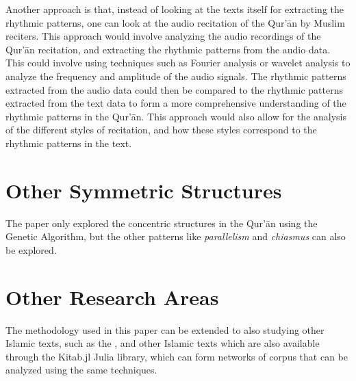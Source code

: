 Another approach is that, instead of looking at the texts itself for extracting the rhythmic patterns, one can look at the audio recitation of the Qur'\=an by Muslim reciters. This approach would involve analyzing the audio recordings of the Qur'\=an recitation, and extracting the rhythmic patterns from the audio data. This could involve using techniques such as Fourier analysis or wavelet analysis to analyze the frequency and amplitude of the audio signals. The rhythmic patterns extracted from the audio data could then be compared to the rhythmic patterns extracted from the text data to form a more comprehensive understanding of the rhythmic patterns in the Qur'\=an. This approach would also allow for the analysis of the different styles of recitation, and how these styles correspond to the rhythmic patterns in the text.

\section{Other Symmetric Structures}
The paper only explored the concentric structures in the Qur'\=an using the Genetic Algorithm, but the other patterns like \textit{parallelism} and \textit{chiasmus} can also be explored. 

\section{Other Research Areas}
The methodology used in this paper can be extended to also studying other Islamic texts, such as the  , and other Islamic texts which are also available through the Kitab.jl \cite{al_ahmadgaid_b_asaad_kitab} Julia library, which can form networks of corpus that can be analyzed using the same techniques.